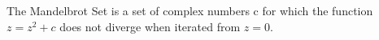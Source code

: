 \documentclass[preview]{standalone}
\begin{document}
\begin{center}
The Mandelbrot Set is a set of complex numbers c
for which the function $z = z^2 + c$ does not diverge
when iterated from $z = 0$.
\end{center}
\end{document}
